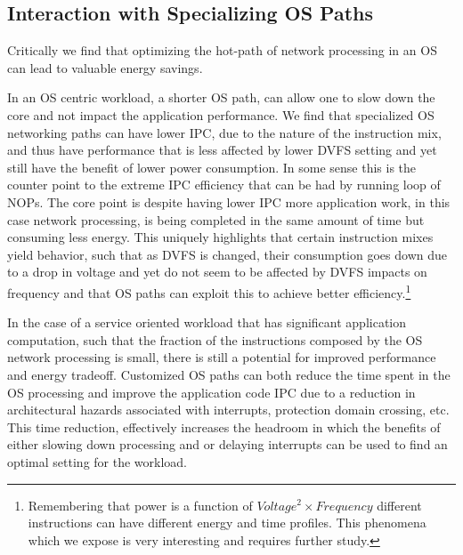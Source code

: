\subsection{Interaction with Specializing OS Paths} 
\label{sec:workflow:osspec}
 Critically we find that optimizing the hot-path of network processing in an OS can lead to valuable energy savings.  

In an OS centric workload, a shorter OS path, can allow one to slow down the core and not impact the application performance.  We find that specialized OS networking paths can have lower IPC, due to the nature of the instruction mix, and thus have performance that is less affected by lower DVFS setting and yet still have the benefit of lower power consumption.  In some sense this is the counter point to the extreme IPC efficiency that can be had by running loop of NOPs.    The core point is despite having lower IPC more application work, in this case network processing, is being completed in the same amount of time but consuming less energy.  This uniquely highlights that certain instruction mixes yield behavior, such that as DVFS is changed, their consumption goes down due to a drop in voltage and yet do not seem to be affected by DVFS impacts on frequency and that OS paths can exploit this to achieve better efficiency.\footnote{Remembering that power is a function of $Voltage^2 \times Frequency$ different instructions can have different energy and time profiles.  This phenomena which we expose is very interesting and requires further study.}

In the case of a service oriented workload that has significant application computation, such that the fraction of the instructions composed by the OS network processing is small, there is still a potential for improved performance and energy tradeoff.  Customized OS paths can both reduce the time spent in the OS processing and improve the application code IPC due to a reduction in architectural hazards associated with interrupts, protection domain crossing, etc.  This time reduction, effectively increases the headroom in which the benefits of either slowing down processing and or delaying interrupts can be used to find an optimal setting for the workload. 
 
